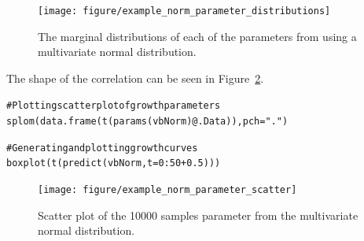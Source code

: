 \documentclass[a4paper,english,10pt]{article}\usepackage[]{graphicx}\usepackage[]{color}
\makeatletter
\newcommand{\hlnum}[1]{\textcolor[rgb]{0.2,0.2,0.2}{#1}}%
\newcommand{\hlstr}[1]{\textcolor[rgb]{0.2,0.2,0.2}{#1}}%
\newcommand{\hlcom}[1]{\textcolor[rgb]{0.2,0.267,0.4}{#1}}%
\newcommand{\hlopt}[1]{\textcolor[rgb]{0.2,0.2,0.2}{#1}}%
\newcommand{\hlstd}[1]{\textcolor[rgb]{0,0,0}{#1}}%
\newcommand{\hlkwc}[1]{\textcolor[rgb]{0.361,0.506,0.596}{#1}}%
\newcommand{\hlkwd}[1]{\textcolor[rgb]{0.361,0.506,0.596}{#1}}%
\newenvironment{kframe}{%
 \def\at@end@of@kframe{}%
 \ifinner\ifhmode%
  \def\at@end@of@kframe{\end{minipage}}%
  \begin{minipage}{\columnwidth}%
 \fi\fi%
 \def\FrameCommand##1{\hskip\@totalleftmargin \hskip-\fboxsep
 \colorbox{shadecolor}{##1}\hskip-\fboxsep
     \hskip-\linewidth \hskip-\@totalleftmargin \hskip\columnwidth}%
 \MakeFramed {\advance\hsize-\width
   \@totalleftmargin\z@ \linewidth\hsize
   \@setminipage}}%
 {\par\unskip\endMakeFramed%
 \at@end@of@kframe}
\newenvironment{knitrout}{}{} %
\makeatother
\begin{document}
\begin{figure}[h]
\begin{knitrout}
\color{fgcolor}

{\centering \texttt{[image: figure/example\_norm\_parameter\_distributions]} 

}



\end{knitrout}

\caption{The marginal distributions of each of the parameters from using a multivariate normal distribution.}
\label{fig:plot_norm_params}
\end{figure}

The shape of the correlation can be seen in Figure~\ref{fig:plot_norm_scatter}.
\begin{knitrout}
\color{fgcolor}\begin{kframe}
\begin{alltt}
\hlcom{# Plotting scatter plot of growth parameters}
\hlkwd{splom}\hlstd{(}\hlkwd{data.frame}\hlstd{(}\hlkwd{t}\hlstd{(}\hlkwd{params}\hlstd{(vbNorm)}\hlopt{@}\hlkwc{.Data}\hlstd{)),} \hlkwc{pch} \hlstd{=} \hlstr{"."}\hlstd{)}
\end{alltt}
\end{kframe}
\end{knitrout}


\begin{knitrout}
\color{fgcolor}\begin{kframe}
\begin{alltt}
\hlcom{# Generating and plotting growth curves}
\hlkwd{boxplot}\hlstd{(}\hlkwd{t}\hlstd{(}\hlkwd{predict}\hlstd{(vbNorm,} \hlkwc{t} \hlstd{=} \hlnum{0}\hlopt{:}\hlnum{50} \hlopt{+} \hlnum{0.5}\hlstd{)))}
\end{alltt}
\end{kframe}
\end{knitrout}


\begin{figure}[h]
\begin{knitrout}
\color{fgcolor}

{\centering \texttt{[image: figure/example\_norm\_parameter\_scatter]} 

}



\end{knitrout}

\caption{Scatter plot of the 10000 samples parameter from the multivariate normal distribution.}
\label{fig:plot_norm_scatter}
\end{figure}
\end{document}
